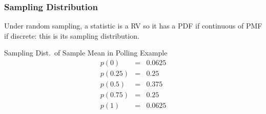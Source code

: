 \begin{frame}
  \frametitle{Sampling Distribution}
  Under random sampling, a statistic is a RV so it has a PDF if continuous of PMF if discrete: this is its \alert{sampling distribution}. 

  \begin{block}{Sampling Dist.\ of Sample Mean in Polling Example}
   \begin{eqnarray*}
   p(0) &=&  0.0625\\
   p(0.25) &=&  0.25\\ 
   p(0.5) &=&  0.375\\
   p(0.75)&=& 0.25\\ 
   p(1) &=&  0.0625
   \end{eqnarray*}

  \end{block}
\end{frame}
